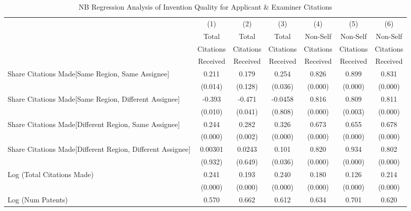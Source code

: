 {
\begin{longtable}{l*{6}{c}}
\caption{NB Regression Analysis of Invention Quality for Applicant \& Examiner Citations \label{ae.model123192021}}\\
\hline\hline\endfirsthead\hline\endhead\hline\endfoot\endlastfoot
                &\multicolumn{1}{c}{(1)}&\multicolumn{1}{c}{(2)}&\multicolumn{1}{c}{(3)}&\multicolumn{1}{c}{(4)}&\multicolumn{1}{c}{(5)}&\multicolumn{1}{c}{(6)}\\
                &\multicolumn{1}{c}{Total}&\multicolumn{1}{c}{Total}&\multicolumn{1}{c}{Total}&\multicolumn{1}{c}{Non-Self}&\multicolumn{1}{c}{Non-Self}&\multicolumn{1}{c}{Non-Self}\\
                &\multicolumn{1}{c}{Citations}&\multicolumn{1}{c}{Citations}&\multicolumn{1}{c}{Citations}&\multicolumn{1}{c}{Citations}&\multicolumn{1}{c}{Citations}&\multicolumn{1}{c}{Citations}\\
                 &\multicolumn{1}{c}{Received}&\multicolumn{1}{c}{Received}&\multicolumn{1}{c}{Received}&\multicolumn{1}{c}{Received}&\multicolumn{1}{c}{Received}&\multicolumn{1}{c}{Received}\\
\hline
Share Citations Made[Same Region, Same Assignee]&    0.211&    0.179&    0.254&    0.826&    0.899&    0.831\\
                &  (0.014)&  (0.128)&  (0.036)&  (0.000)&  (0.000)&  (0.000)\\
Share Citations Made[Same Region, Different Assignee]&   -0.393&   -0.471&  -0.0458&    0.816&    0.809&    0.811\\
                &  (0.010)&  (0.041)&  (0.808)&  (0.000)&  (0.003)&  (0.000)\\
Share Citations Made[Different Region, Same Assignee]&    0.244&    0.282&    0.326&    0.673&    0.655&    0.678\\
                &  (0.000)&  (0.002)&  (0.000)&  (0.000)&  (0.000)&  (0.000)\\
Share Citations Made[Different Region, Different Assignee]&  0.00301&   0.0243&    0.101&    0.820&    0.934&    0.802\\
                &  (0.932)&  (0.649)&  (0.036)&  (0.000)&  (0.000)&  (0.000)\\
Log (Total Citations Made)&    0.241&    0.193&    0.240&    0.180&    0.126&    0.214\\
                &  (0.000)&  (0.000)&  (0.000)&  (0.000)&  (0.000)&  (0.000)\\
Log (Num Patents)&    0.570&    0.662&    0.612&    0.634&    0.701&    0.620\\

\end{longtable}}
